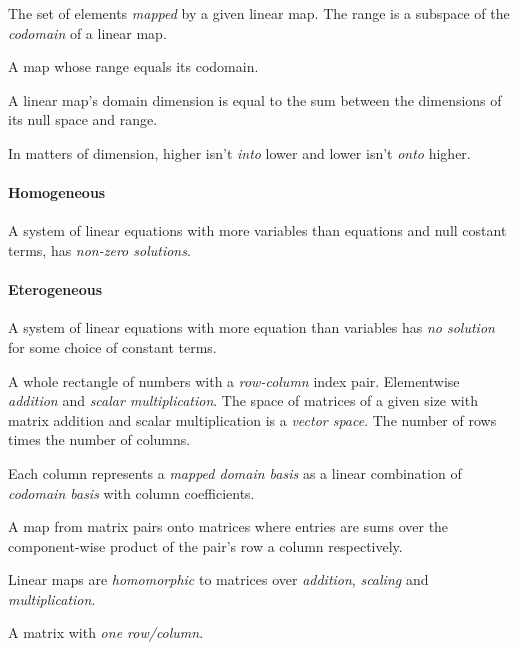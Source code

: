 \begin{multicols}{3}
  The set of elements \textit{mapped} by a given linear map.
  The range is a subspace of the \textit{codomain} of a linear map.

  A map whose range equals its codomain.

  A linear map's domain dimension is equal to the sum between the dimensions of its null space and range.

  In matters of dimension, higher isn't \textit{into} lower and lower isn't \textit{onto} higher.

  \paragraph{\textbf{Homogeneous}}
  A system of linear equations with more variables than equations and null costant terms, has \textit{non-zero solutions}.
  
  \paragraph{\textbf{Eterogeneous}}
  A system of linear equations with more equation than variables has \textit{no solution} for some choice of constant terms.
  
  A whole rectangle of numbers with a \textit{row-column} index pair.
  Elementwise \textit{addition} and \textit{scalar multiplication}.
  The space of matrices of a given size with matrix addition and scalar multiplication is a \textit{vector space}.
  The number of rows times the number of columns.
  
  Each column represents a \textit{mapped domain basis} as a linear combination of \textit{codomain basis} with column coefficients.
  
  A map from matrix pairs onto matrices where entries are sums over the component-wise product of
  the pair's row a column respectively.
  
  Linear maps are \textit{homomorphic} to matrices over \textit{addition}, \textit{scaling} and \textit{multiplication}.

  A matrix with \textit{one row/column}.


\end{multicols}
